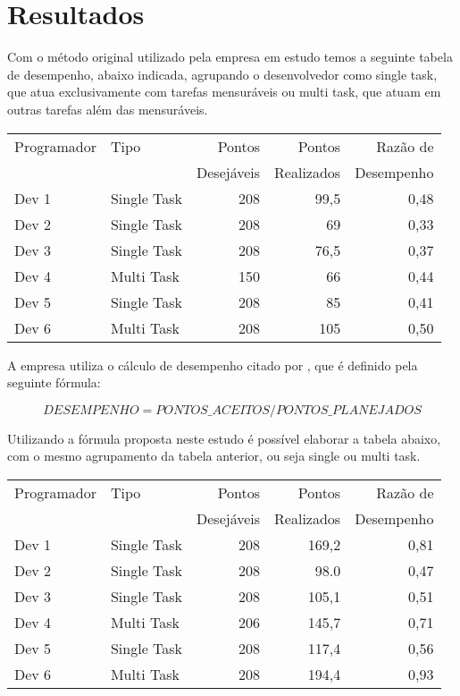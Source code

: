 \section{Resultados}

Com o método original utilizado pela empresa em estudo temos a seguinte tabela de desempenho, abaixo indicada, agrupando o desenvolvedor como single task, que atua exclusivamente com tarefas mensuráveis ou multi task, que atuam em outras tarefas além das mensuráveis.

\begin{center}
\begin{tabular}{ | l | l | r | r | r | } 
 \hline
 Programador & Tipo & Pontos & Pontos & Razão de \\ 
 & & Desejáveis & Realizados & Desempenho \\ \hline
 Dev 1 & Single Task & 208 & 99,5 & 0,48 \\
 Dev 2 & Single Task & 208 & 69 & 0,33 \\
 Dev 3 & Single Task & 208 & 76,5 & 0,37 \\
 Dev 4 & Multi Task & 150 & 66 & 0,44 \\
 Dev 5 & Single Task & 208 & 85 & 0,41 \\
 Dev 6 & Multi Task & 208 & 105 & 0,50 \\
 \hline
\end{tabular}
\end{center}

A empresa utiliza o cálculo de desempenho citado por , que é definido pela seguinte fórmula:\par
\[
DESEMPENHO = PONTOS\_ACEITOS/PONTOS\_PLANEJADOS
\]

Utilizando a fórmula proposta neste estudo é possível elaborar a tabela abaixo, com o mesmo agrupamento da tabela anterior, ou seja single ou multi task.

\begin{center}
\begin{tabular}{ | l | l | r | r | r | } 
 \hline
 Programador & Tipo & Pontos & Pontos & Razão de \\ 
 & & Desejáveis & Realizados & Desempenho \\ \hline
 Dev 1 & Single Task & 208 & 169,2 & 0,81 \\
 Dev 2 & Single Task & 208 & 98.0 & 0,47 \\
 Dev 3 & Single Task & 208 & 105,1 & 0,51 \\
 Dev 4 & Multi Task & 206 & 145,7 & 0,71 \\
 Dev 5 & Single Task & 208 & 117,4 & 0,56 \\
 Dev 6 & Multi Task & 208 & 194,4 & 0,93 \\
 \hline
\end{tabular}
\end{center}

